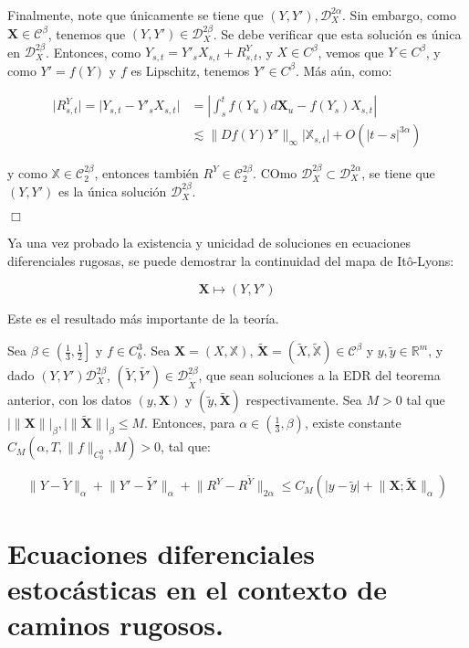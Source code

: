 Finalmente, note que únicamente se tiene que $(Y, Y') ,\mathscr{D}^{2\alpha}_X$. Sin embargo, como $\mathbf{X} \in \mathscr{C}^{\beta}$, tenemos que $(Y, Y') \in \mathscr{D}^{2\beta}_X$. Se debe verificar que esta solución es única en $\mathscr{D}^{2\beta}_X$. Entonces, como $Y_{s,t} = Y'_s X_{s,t} + R^Y_{s,t}$, y $X \in C^{\beta}$, vemos que $Y \in C^{\beta}$, y como $Y' = f(Y)$ y $f$ es Lipschitz, tenemos $Y' \in C^{\beta}$. Más aún, como:

\begin{align*}
	\lvert R^Y_{s,t} \rvert = \lvert Y_{s,t} - Y'_s X_{s,t} \rvert &= \left\lvert \int_s^t f(Y_u) d\mathbf{X}_u - f(Y_s) X_{s,t} \right\rvert \\
	&\lesssim \lVert Df(Y) Y' \rVert_{\infty} \lvert \mathbb{X}_{s,t} \rvert + O( \lvert t - s \rvert^{3\alpha} )
\end{align*}

y como $\mathbb{X} \in \mathcal{C}^{2\beta}_2$, entonces también $R^Y \in \mathcal{C}^{2\beta}_2$. COmo $\mathscr{D}^{2\beta}_X \subset \mathscr{D}^{2\alpha}_X$, se tiene que $(Y,Y')$ es la única solución $\mathscr{D}^{2\beta}_X$.

\begin{flushright}
	$\Box$
\end{flushright}
		

Ya una vez probado la existencia y unicidad de soluciones en ecuaciones diferenciales rugosas, se puede demostrar la continuidad del mapa de Itô-Lyons:

\[
	\mathbf{X} \mapsto (Y, Y')
\]

Este es el resultado más importante de la teoría.

\begin{theorem}
	Sea $\beta \in \left( \frac{1}{3}, \frac{1}{2} \right]$ y $f \in C^3_b$. Sea $\mathbf{X} = (X, \mathbb{X})$, $\tilde{\mathbf{X}} = (\tilde{X}, \tilde{\mathbb{X}}) \in \mathscr{C}^{\beta}$ y $y, \tilde{y} \in \mathbb{R}^m$, y dado $(Y, Y') \mathscr{D}_X^{2\beta}$, $(\tilde{Y}, \tilde{Y'}) \in \mathscr{D}_{\tilde{X}}^{2\beta}$, que sean soluciones a la EDR del teorema anterior, con los datos $(y, \mathbf{X})$ y $(\tilde{y}, \tilde{\mathbf{X}})$ respectivamente. Sea $M > 0$ tal que $\lvert \lVert \mathbf{X} \rVert \rvert_{\beta}, \lvert \lVert \mathbf{ \tilde{X} } \rVert \rvert_{\beta} \leq M$. Entonces, para $\alpha \in \left( \frac{1}{3}, \beta \right)$, existe constante $C_M(\alpha, T, \lVert f \rVert_{C^3_b}, M) > 0$, tal que:

    \[
        \lVert Y - \tilde{Y} \rVert_{\alpha} + \lVert Y' - \tilde{Y'} \rVert_{\alpha} + \lVert R^Y - R^{\tilde{Y}}\rVert_{2\alpha} \leq C_M \left( \lvert y - \tilde{y} \rvert + \lVert \mathbf{X}; \mathbf{ \tilde{X} } \rVert_{\alpha} \right)
    \]

\end{theorem}


\section{Ecuaciones diferenciales estocásticas en el contexto de caminos rugosos.}

